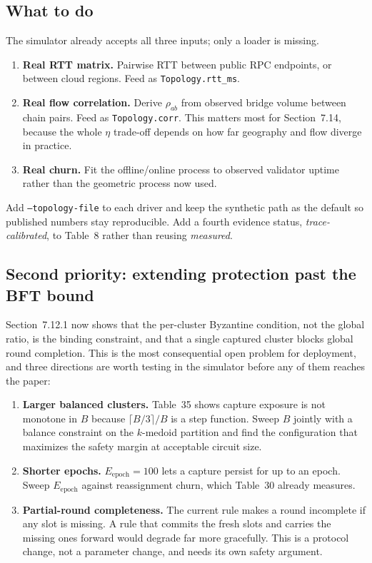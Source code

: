\documentclass[11pt,a4paper]{article}
\begin{document}
\subsection*{What to do}

The simulator already accepts all three inputs; only a loader is missing.

\begin{enumerate}[leftmargin=*,itemsep=3pt]
  \item \textbf{Real RTT matrix.} Pairwise RTT between public RPC endpoints, or
  between cloud regions. Feed as \texttt{Topology.rtt\_ms}.
  \item \textbf{Real flow correlation.} Derive $\rho_{ab}$ from observed bridge
  volume between chain pairs. Feed as \texttt{Topology.corr}. This matters most
  for Section~7.14, because the whole $\eta$ trade-off depends on how far
  geography and flow diverge in practice.
  \item \textbf{Real churn.} Fit the offline/online process to observed
  validator uptime rather than the geometric process now used.
\end{enumerate}

Add \texttt{--topology-file} to each driver and keep the synthetic path as the
default so published numbers stay reproducible. Add a fourth evidence status,
\emph{trace-calibrated}, to Table~8 rather than reusing \emph{measured}.

\subsection*{Second priority: extending protection past the BFT bound}

Section~7.12.1 now shows that the per-cluster Byzantine condition, not the
global ratio, is the binding constraint, and that a single captured cluster
blocks global round completion. This is the most consequential open problem for
deployment, and three directions are worth testing in the simulator before any
of them reaches the paper:

\begin{enumerate}[leftmargin=*,itemsep=3pt]
  \item \textbf{Larger balanced clusters.} Table~35 shows capture exposure is
  not monotone in $B$ because $\lceil B/3\rceil/B$ is a step function. Sweep
  $B$ jointly with a balance constraint on the $k$-medoid partition and find
  the configuration that maximizes the safety margin at acceptable circuit size.
  \item \textbf{Shorter epochs.} $E_{\mathrm{epoch}}=100$ lets a capture persist
  for up to an epoch. Sweep $E_{\mathrm{epoch}}$ against reassignment churn,
  which Table~30 already measures.
  \item \textbf{Partial-round completeness.} The current rule makes a round
  incomplete if any slot is missing. A rule that commits the fresh slots and
  carries the missing ones forward would degrade far more gracefully. This is a
  protocol change, not a parameter change, and needs its own safety argument.
\end{enumerate}
\end{document}
